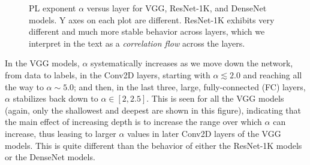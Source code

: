 \begin{figure}[t]
    \centering

    \qquad
    \qquad
    \caption{PL exponent $\alpha$ versus layer for VGG, ResNet-1K, and DenseNet models.  Y axes on each plot are different.  ResNet-1K exhibits very different and much more stable behavior across layers, which we interpret in the text as a \emph{correlation flow} across the layers.  }
    \label{fig:vgg-alpha-layers}
\end{figure}

In the VGG models, $\alpha$ systematically increases as we move down the network, from data to labels, in the Conv2D layers, starting with $\alpha\lesssim 2.0$ and reaching all the way to $\alpha\sim 5.0$; and then, in the last three, large, fully-connected (FC) layers, $\alpha$ stabilizes back down to $\alpha\in[2,2.5]$.
This is seen for all the VGG models (again, only the shallowest and deepest are shown in this figure), indicating that the main effect of increasing depth is to increase the range over which $\alpha$ can increase, thus leasing to larger $\alpha$ values in later Conv2D layers of the VGG models.
This is quite different than the behavior of either the ResNet-1K models or the DenseNet models.


